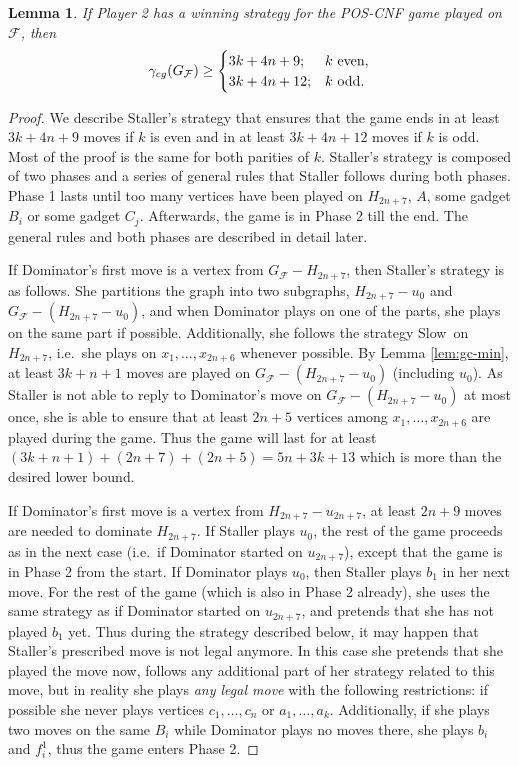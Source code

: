 \documentclass[12pt]{article}
\newtheorem{lemma}[theorem]{Lemma}
\newcommand{\gcg}{\gamma_{\rm cg}}
\newcommand{\F}{\mathcal{F}}
\newcommand{\slow}{{\sc Slow}}
\begin{document}
\begin{lemma}
	\label{lem:p2-wins}
	If Player 2 has a winning strategy for the POS-CNF game played on $\F$, then $$\gcg(G_\F) \geq \begin{cases}
		3k + 4n + 9; & k \text{ even},\\
		3k + 4n + 12; & k \text{ odd}.
	\end{cases}$$
\end{lemma}

\begin{proof}
	We describe Staller's strategy that ensures that the game ends in at least $3k + 4n + 9$ moves if $k$ is even and in at least $3k + 4n + 12$ moves if $k$ is odd. Most of the proof is the same for both parities of $k$. Staller's strategy is composed of two phases and a series of general rules that Staller follows during both phases. Phase 1 lasts until too many vertices have been played on $H_{2n+7}$, $A$, some gadget $B_i$ or some gadget $C_j$. Afterwards, the game is in Phase 2 till the end. The general rules and both phases are described in detail later.
	
	If Dominator's first move is a vertex from $G_\F - H_{2n+7}$, then Staller's strategy is as follows. She partitions the graph into two subgraphs, $H_{2n+7} - u_0$ and $G_\F - (H_{2n+7} - u_0)$, and when Dominator plays on one of the parts, she plays on the same part if possible. Additionally, she follows the strategy \slow\ on $H_{2n+7}$, i.e.\ she plays on $x_1, \ldots, x_{2n+6}$ whenever possible. By Lemma \ref{lem:gc-min}, at least $3k + n + 1$ moves are played on $G_\F - (H_{2n+7} - u_0)$ (including $u_0$). As Staller is not able to reply to Dominator's move on $G_\F - (H_{2n+7} - u_0)$ at most once, she is able to ensure that at least $2n+5$ vertices among $x_1, \ldots, x_{2n+6}$ are played during the game. Thus the game will last for at least $(3k + n + 1) + (2n+7) + (2n+5) = 5n+3k+13$ which is more than the desired lower bound.
	
	If Dominator's first move is a vertex from $H_{2n+7} - u_{2n+7}$, at least $2n+9$ moves are needed to dominate $H_{2n+7}$. If Staller plays $u_0$, the rest of the game proceeds as in the next case (i.e.\ if Dominator started on $u_{2n+7}$), except that the game is in Phase 2 from the start. If Dominator plays $u_0$, then Staller plays $b_1$ in her next move. For the rest of the game (which is also in Phase 2 already), she uses the same strategy as if Dominator started on $u_{2n+7}$, and pretends that she has not played $b_1$ yet. Thus during the strategy described below, it may happen that Staller's prescribed move is not legal anymore. In this case she pretends that she played the move now, follows any additional part of her strategy related to this move, but in reality she plays \emph{any legal move} with the following restrictions: if possible she never plays vertices $c_1, \ldots, c_n$ or $a_1, \ldots, a_k$. Additionally, if she plays two moves on the same $B_i$ while Dominator plays no moves there, she plays $b_i$ and $f_i^1$, thus the game enters Phase 2.
	

\end{proof}
\end{document}
